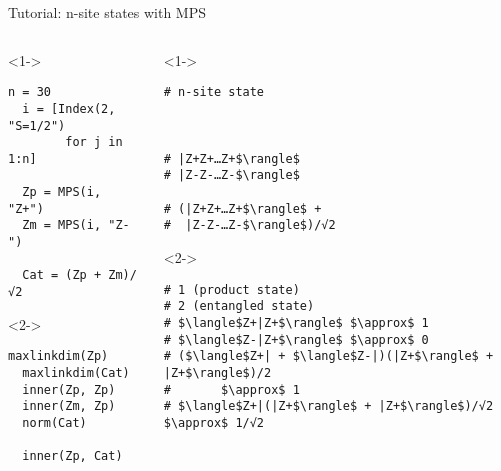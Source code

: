 \begin{frame}[fragile]{Tutorial: n-site states with MPS}


\begin{columns}

\begin{column}{4.5cm}

\begin{onlyenv}<1->

\begin{lstlisting}[language=JuliaLocal, style=julia, mathescape, basicstyle=\small]
  n = 30
  i = [Index(2, "S=1/2")
        for j in 1:n]

  Zp = MPS(i, "Z+")
  Zm = MPS(i, "Z-")

  Cat = (Zp + Zm)/√2
 \end{lstlisting}

\end{onlyenv}

\begin{onlyenv}<2->

\begin{lstlisting}[language=JuliaLocal, style=julia, mathescape, basicstyle=\small]
  maxlinkdim(Zp)
  maxlinkdim(Cat)
  inner(Zp, Zp)
  inner(Zm, Zp)
  norm(Cat)

  inner(Zp, Cat)
\end{lstlisting}

\end{onlyenv}

\end{column}

\begin{column}{5.5cm}

\begin{onlyenv}<1->

\begin{lstlisting}[style=julia, numbers=none, mathescape, basicstyle=\small]
# n-site state



# |Z+Z+…Z+$\rangle$
# |Z-Z-…Z-$\rangle$

# (|Z+Z+…Z+$\rangle$ +
#  |Z-Z-…Z-$\rangle$)/√2
\end{lstlisting}

\end{onlyenv}

\begin{onlyenv}<2->

\begin{lstlisting}[style=julia, numbers=none, mathescape, basicstyle=\small]
# 1 (product state)
# 2 (entangled state)
# $\langle$Z+|Z+$\rangle$ $\approx$ 1
# $\langle$Z-|Z+$\rangle$ $\approx$ 0
# ($\langle$Z+| + $\langle$Z-|)(|Z+$\rangle$ + |Z+$\rangle$)/2
#       $\approx$ 1
# $\langle$Z+|(|Z+$\rangle$ + |Z+$\rangle$)/√2 $\approx$ 1/√2
\end{lstlisting}

\end{onlyenv}

\end{column}

\end{columns}

\end{frame}
